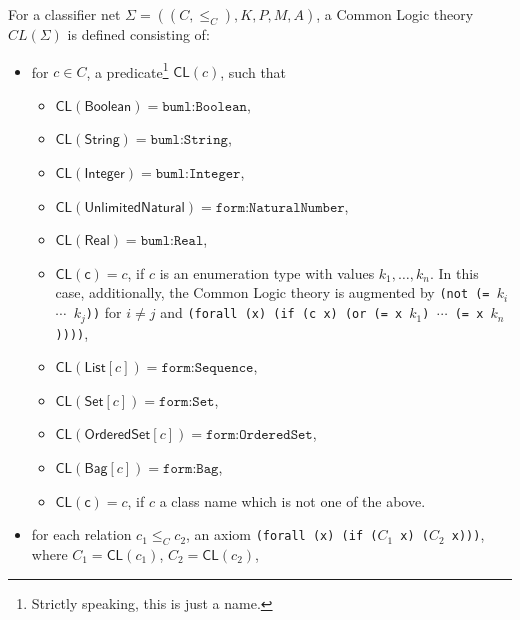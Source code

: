 \documentclass[10pt,fleqn,final]{scrreprt}
\newcommand{\cbs}[0]{\color{red}\xspace} %
\newcommand{\cbe}[0]{\color{black}\xspace} %
\newcommand*{\CL}{\ensuremath{\mathsf{CL}}\xspace}
\newenvironment{definitions}[0]{\medskip }{}
\begin{document}
\begin{definitions}
For a classifier net
$\Sigma = ((C, {\leq_C}), K, P, M, A)$,\cbs a Common Logic theory
$CL(\Sigma)$ is defined\cbe consisting of:
%
\begin{itemize} %
\item for $c \in C$, a predicate\footnote{Strictly speaking, this is just a name.} $\CL(c)$,  such that
\begin{itemize} %
\item 
  $\CL(\mathsf{Boolean}) = \texttt{buml:Boolean}$, 
\item 
  $\CL(\mathsf{String}) = \texttt{buml:String}$,
\item 
  $\CL(\mathsf{Integer}) = \texttt{buml:Integer}$,
\item 
  $\CL(\mathsf{UnlimitedNatural}) = \texttt{form:NaturalNumber}$,
\item 
  $\CL(\mathsf{Real}) = \texttt{buml:Real}$,
\item 
  $\CL(\mathsf{c}) = c$, if $c$ is an enumeration type with values $k_1,\ldots,k_n$. In this case, additionally, the Common Logic theory is augmented by
\texttt{(not (= $k_i$ $\cdots$ $k_j$))} for $i\neq j$ and
\texttt{(forall (x) (if (c x) (or (= x $k_1$) $\cdots$ (= x $k_n$))))},
\item 
  $\CL(\mathsf{List}[c]) = \texttt{form:Sequence}$,
\item 
  $\CL(\mathsf{Set}[c]) = \texttt{form:Set}$,
\item 
  $\CL(\mathsf{OrderedSet}[c]) = \texttt{form:OrderedSet}$,
\item 
  $\CL(\mathsf{Bag}[c]) = \texttt{form:Bag}$,
\item 
  $\CL(\mathsf{c}) = c$, if $c$ a class name which is not one of the above. 
\end{itemize}
\item for each relation $c_1
  \leq_C c_2$, an axiom \texttt{(forall (x) (if ($C_1$ x) ($C_2$ x)))},
  where $C_1 = \CL(c_1)$, $C_2 = \CL(c_2)$, 


\end{itemize}
\end{definitions}
\end{document}
